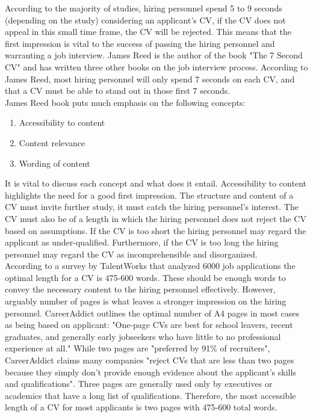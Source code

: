 According to the majority of studies, hiring personnel spend 5 to 9 seconds (depending on the study) considering an applicant's CV, if the CV does not appeal in this small time frame, the CV will be rejected.
This means that the first impression is vital to the success of passing the hiring personnel and warranting a job interview.
James Reed is the author of the book "The 7 Second CV" and has written three other books on the job interview process.\cite{7_second_test}
According to James Reed, most hiring personnel will only spend 7 seconds on each CV, and that a CV must be able to stand out in those first 7 seconds. \cite{7_Seconds_to_Get_a_Recruiter_Attention} \\
James Reed book puts much emphasis on the following concepts:
\begin{enumerate}
   \item Accessibility to content 
   \item Content relevance
   \item Wording of content
\end{enumerate}\cite{7_second_test}
It is vital to discuss each concept and what does it entail.
Accessibility to content highlights the need for a good first impression.
The structure and content of a CV must invite further study, it must catch the hiring personnel's interest.
The CV must also be of a length in which the hiring personnel does not reject the CV based on assumptions.
If the CV is too short the hiring personnel may regard the applicant as under-qualified.
Furthermore, if the CV is too long the hiring personnel may regard the CV as incomprehensible and disorganized. \\

According to a survey by TalentWorks that analyzed 6000 job applications the optimal length for a CV is 475-600 words.\cite{CV_Word_length}
These should be enough words to convey the necessary content to the hiring personnel effectively. 
However, arguably number of pages is what leaves a stronger impression on the hiring personnel.
CareerAddict outlines the optimal number of A4 pages in most cases as being based on applicant:\cite{CV_Page_length}
"One-page CVs are best for school leavers, recent graduates, and generally early jobseekers who have little to no professional experience at all."\cite{CV_Page_length}
While two pages are "preferred by 91\% of recruiters", CareerAddict claims many companies "reject CVs that are less than two pages because they simply don’t provide enough evidence about the applicant’s skills and qualifications".\cite{CV_Page_length}
Three pages are generally used only by executives or academics that have a long list of qualifications.
Therefore, the most accessible length of a CV for most applicants is two pages with 475-600 total words. \\

